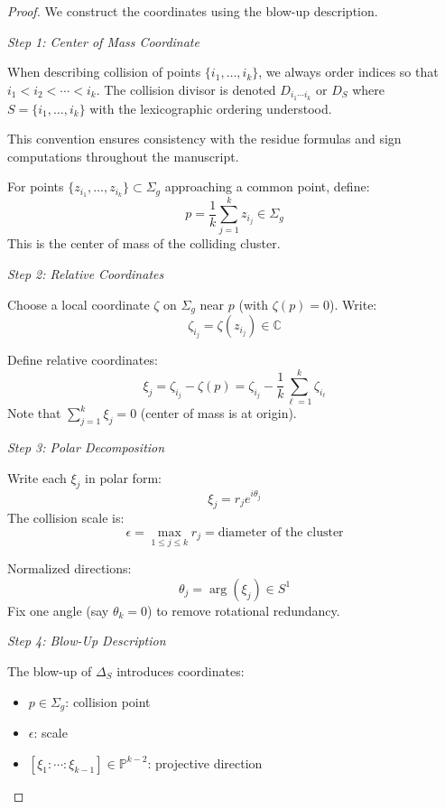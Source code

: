 \begin{proof}
We construct the coordinates using the blow-up description.

\medskip
\noindent\emph{Step 1: Center of Mass Coordinate}

\begin{remark}\label{rem:collision-ordering}
When describing collision of points $\{i_1, \ldots, i_k\}$, we always order indices so that $i_1 < i_2 < \cdots < i_k$. The collision divisor is denoted $D_{i_1 \cdots i_k}$ or $D_S$ where $S = \{i_1, \ldots, i_k\}$ with the lexicographic ordering understood.

This convention ensures consistency with the residue formulas and sign computations throughout the manuscript.
\end{remark}

For points $\{z_{i_1}, \ldots, z_{i_k}\} \subset \Sigma_g$ approaching a common point, define:
\[p = \frac{1}{k}\sum_{j=1}^k z_{i_j} \in \Sigma_g\]
This is the center of mass of the colliding cluster.

\medskip
\noindent\emph{Step 2: Relative Coordinates}

Choose a local coordinate $\zeta$ on $\Sigma_g$ near $p$ (with $\zeta(p) = 0$). Write:
\[\zeta_{i_j} = \zeta(z_{i_j}) \in \mathbb{C}\]

Define relative coordinates:
\[\xi_j = \zeta_{i_j} - \zeta(p) = \zeta_{i_j} - \frac{1}{k}\sum_{\ell=1}^k \zeta_{i_\ell}\]
Note that $\sum_{j=1}^k \xi_j = 0$ (center of mass is at origin).

\medskip
\noindent\emph{Step 3: Polar Decomposition}

Write each $\xi_j$ in polar form:
\[\xi_j = r_j e^{i\theta_j}\]
The collision scale is:
\[\epsilon = \max_{1 \leq j \leq k} r_j = \text{diameter of the cluster}\]

Normalized directions:
\[\theta_j = \arg(\xi_j) \in S^1\]
Fix one angle (say $\theta_k = 0$) to remove rotational redundancy.

\medskip
\noindent\emph{Step 4: Blow-Up Description}

The blow-up of $\Delta_S$ introduces coordinates:
\begin{itemize}
\item $p \in \Sigma_g$: collision point
\item $\epsilon$: scale
\item $[\xi_1 : \cdots : \xi_{k-1}] \in \mathbb{P}^{k-2}$: projective direction
\end{itemize}


\end{proof}
